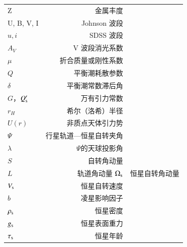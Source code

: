 \begin{multicols}{2}
\begin{tabularx}{0.85\linewidth}{@{\extracolsep{\fill}}lr}
\end{tabularx}
\columnbreak

\begin{tabularx}{0.85\linewidth}{@{\extracolsep{\fill}}lr}
\centering

Z		       	 		&      金属丰度   		\\
U, B, V, I		       	 	&      Johnson 波段   		\\
$u,i$		       	 		&      SDSS 波段 		\\
$A_V$		       	 	&      V 波段消光系数   	\\
$\mu$ 				&	折合质量或刚性系数	\\
$Q$ 					&	平衡潮耗散参数		\\
$\delta$ 				&	平衡潮常数滞后角	\\
$G$，$Q_\mathrm{s}^\prime$	&	万有引力常数		\\
$r_H$ 				&	希尔（洛希）半径	\\
$U(r)$ 				&	非质点天体引力势	\\
$\Psi$ 				&   行星轨道---恒星自转夹角 \\
$\lambda$ 			&	$\Psi$的天球投影角	\\
$S$ 					&	自转角动量		\\
$L$ 					&      轨道角动量
$\Omega_\mathrm{s}$ 		&	恒星自转角动量		\\
$V_\mathrm{s}$ 			&	恒星自转速度		\\
$b$ 					&	凌星影响因子		\\
$\rho_\mathrm{s}$         	 	&      恒星密度   		\\
$g_\mathrm{s}$         	 		&      恒星表面重力   		\\
$\tau_\mathrm{s}$        	 	&      恒星年龄   		\\

\end{tabularx}
\end{multicols}

\newpage


